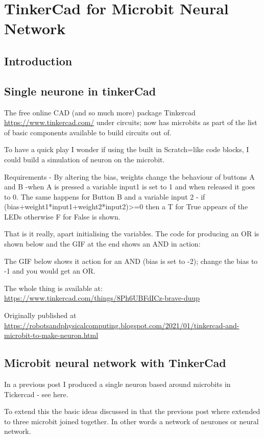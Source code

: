 \chapter{TinkerCad for Microbit Neural Network}
\section{Introduction}
\section{Single neurone in tinkerCad}
The free online CAD (and so much more) package Tinkercad \url{https://www.tinkercad.com/} under circuits; now has microbits as part of the list of basic components available to build circuits out of.

To have a quick play I wonder if using the built in Scratch=like code blocks, I could build a simulation of neuron on the microbit.

Requirements 
- By altering the bias, weights change the behaviour of buttons A and B
-when A is pressed a variable input1 is set to 1 and when released it goes to 0. The same happens for Button B and a variable input 2
- if (bias+weight1*input1+weight2*input2)>=0 then a T for True appears of the LEDs otherwise F for False is shown.

That is it really, apart initialising the variables. The code for producing an OR is shown below and the GIF at the end shows an AND in action:








The GIF below shows it action for an AND (bias is set to -2); change the bias to -1 and you would get an OR.




The whole thing is available at: \url{https://www.tinkercad.com/things/8Ph6UBFdICz-brave-duup }

Originally published at \url{https://robotsandphysicalcomputing.blogspot.com/2021/01/tinkercad-and-microbit-to-make-neuron.html}


\section{Microbit neural network with TinkerCad}
In a previous post I produced a single neuron based around microbits in Tickercad - see here.

To extend this the basic ideas discussed in that the previous post where extended to three microbit joined together. In  other words a network of neurones or neural network.

